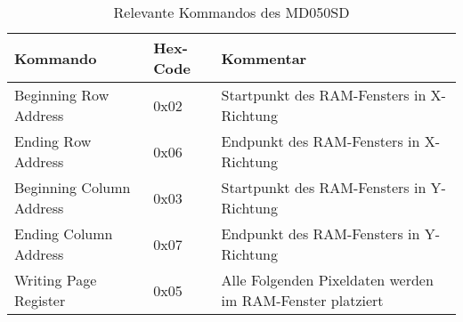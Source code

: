 \begin{table}[h]
\begin{tabular}{|p{4cm}|p{1cm}|p{8cm}|}\hline
\rowcolor{TableBackgroundColor}
   \textbf{Kommando} & \textbf{Hex-Code} & \textbf{Kommentar}\\ \hline
   Beginning Row Address & 0x02 & Startpunkt des RAM-Fensters in X-Richtung \\ \hline
   Ending Row Address& 0x06 & Endpunkt des RAM-Fensters in X-Richtung \\ \hline
   Beginning Column Address & 0x03 & Startpunkt des RAM-Fensters in Y-Richtung \\ \hline
   Ending Column Address& 0x07 & Endpunkt des RAM-Fensters in Y-Richtung \\ \hline
   Writing Page Register & 0x05 & Alle Folgenden Pixeldaten werden im RAM-Fenster platziert \\ \hline
\end{tabular}
\caption{Relevante Kommandos des MD050SD}
\label{tab:Kommandos_MD050SD}
\end{table}

% 






